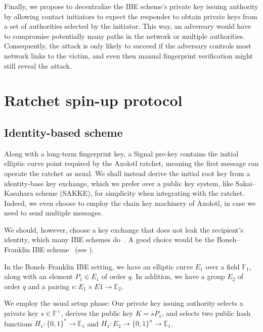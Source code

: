 \documentclass[twoside,letterpaper]{sig-alternate}
\begin{document}
Finally, we propose to decentralize the IBE scheme's private key
issuing authority by allowing contact initiators to expect the
responder to obtain private keys from a set of authorities selected by
the initiator.  This way, an adversary would have to compromise
potentially many paths in the network or multiple authorities.
Consequently, the attack is only likely to succeed if the adversary
controls most network links to the victim, and even then manual
fingerprint verification might still reveal the attack.


\section{Ratchet spin-up protocol}

\def\E{\mathbb{E}}
\def\F{\mathbb{F}}
\def\Z{\mathbb{Z}}
\def\ID{\mathtt{ID}}
\def\rk{\mathtt{rk}}
\def\ck{\mathtt{ck}}
\def\mk{\mathtt{mk}}

\subsection{Identity-based scheme}

Along with a long-term fingerprint key,
a Signal pre-key contains the initial elliptic curve point required
by the Axolotl ratchet, meaning
 the first message can operate the ratchet as usual.
We shall instead derive the initial root key from a identity-base key
exchange, which we prefer over a public key system,
 like Sakai–Kasahara scheme (SAKKE),
for simplicity when integrating with the ratchet.
Indeed, we even choose to employ the chain key machinery of Axolotl,
 in case we need to send multiple messages.

We should, however, choose a key exchange that does not leak the recipient's
identity, which many IBE schemes do~\cite{AnonIBE}.
A good choice would be the Boneh–Franklin IBE scheme~\cite{BF-IBE}
(see \cite[??]{BoyenMIBS}).

In the Boneh–Franklin IBE setting,
we have an elliptic curve $E_1$ over a field $\F_1$,
 along with an element $P_1 \in E_1$ of order $q$.
In addition, we have a group $E_2$ of order $q$ and
 a pairing $e: E_1 \times E1 \to \mathbb{E}_2$.

We employ the usual setup phase:
Our private key issuing authority
 selects a private key $s \in \F^\times$,
 derives the public key $K = s P_1$, and
 selects two public hash functions
  $H_1: \{0,1\}^* \to \E_1$ and $H_1: E_2 \to \{0,1\}^n \to \E_1$.
\end{document}
